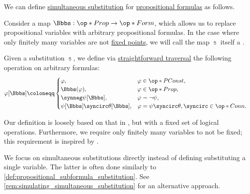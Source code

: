 \begin{definition}\label{def:propositional_substitution}\mimprovised
  We can define \hyperref[con:syntactic_substitution]{simultaneous substitution} for \hyperref[def:propositional_formula]{propositional formulas} as follows.

  Consider a map \( \Bbbs: \op*{Prop} \to \op*{Form} \), which allows us to replace propositional variables with arbitrary propositional formulas. In the case where only finitely many variables are not \hyperref[def:function_fixed_point]{fixed points}, we will call the map \( \Bbbs \) itself a .

  Given a substitution \( \Bbbs \), we define via \hyperref[rem:straightforward_traversal]{straightforward traversal} the following operation on arbitrary formulas:
  \begin{equation*}
    \varphi[\Bbbs] \coloneqq \begin{cases}
      \varphi,                            &\varphi \in \op*{PConst}, \\
      \Bbbs(\varphi),                     &\varphi \in \op*{Prop}, \\
      \synneg \psi[\Bbbs],                &\varphi = \neg \psi, \\
      \psi[\Bbbs] \syncirc \theta[\Bbbs], &\varphi = \psi \syncirc \theta, {\syncirc} \in \op*{Conn}. \\
    \end{cases}
  \end{equation*}
\end{definition}
\begin{comments}
  \item Our definition is loosely based on that in \cite[def. 3.1.3]{CitkinMuravitsky2022ConsequenceRelations}, but with a fixed set of logical operations. Furthermore, we require only finitely many variables to not be fixed; this requirement is inspired by \cite[222]{Mimram2020ProgramEqualsProof}.

  \item We focus on simultaneous substitutions directly instead of defining substituting a single variable. The latter is often done similarly to \cref{def:propositional_subformula_substitution}. See \cref{rem:simulating_simultaneous_substitution} for an alternative approach.
\end{comments}

